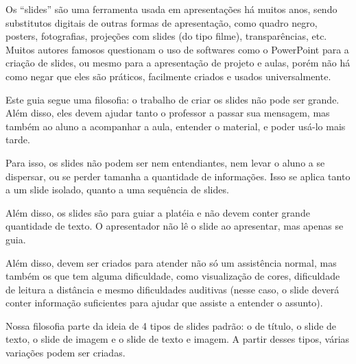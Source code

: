 Os ``slides'' são uma ferramenta usada em apresentações há muitos anos, sendo substitutos digitais de outras formas de apresentação, como quadro negro, posters, fotografias, projeções com slides (do tipo filme), transparências, etc.
Muitos autores famosos questionam o uso de softwares como o PowerPoint para a criação de slides, ou mesmo para a apresentação de projeto e aulas, porém não há como negar que eles são práticos, facilmente criados e usados universalmente.

Este guia segue uma filosofia: o trabalho de criar os slides não pode ser grande.
Além disso, eles devem ajudar tanto o professor a passar sua mensagem, mas também ao aluno a acompanhar a aula, entender o material, e poder usá-lo mais tarde.

Para isso, os slides não podem ser nem entendiantes, nem levar o aluno a se dispersar, ou se perder tamanha a quantidade de informações.
Isso se aplica tanto a um slide isolado, quanto a uma sequência de slides.

Além disso, os slides são para guiar a platéia e não devem conter grande quantidade de texto.
O apresentador não lê o slide ao apresentar, mas apenas se guia.

Além disso, devem ser criados para atender não só um assistência normal, mas também os que tem alguma dificuldade, como visualização de cores, dificuldade de leitura a distância e mesmo dificuldades auditivas (nesse caso, o slide deverá conter informação suficientes para ajudar que assiste a entender o assunto).

Nossa filosofia parte da ideia de 4 tipos de slides padrão: o de título, o slide de texto, o slide de imagem e o slide de texto e imagem.
A partir desses tipos, várias variações podem ser criadas.

